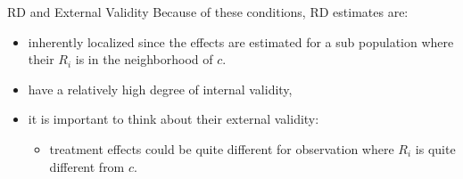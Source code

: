 \documentclass[
  ignorenonframetext,
]{beamer}
\providecommand{\tightlist}{%
  \setlength{\itemsep}{0pt}\setlength{\parskip}{0pt}}
\begin{document}
\begin{frame}{RD and External Validity}
\protect\hypertarget{rd-and-external-validity-3}{}
Because of these conditions, RD estimates are:

\begin{itemize}
\item
  inherently localized since the effects are estimated for a sub
  population where their \(R_i\) is in the neighborhood of \(c\).
\item
  have a relatively high degree of internal validity,
\item
  it is important to think about their external validity:

  \begin{itemize}
  \tightlist
  \item
    treatment effects could be quite different for observation where
    \(R_i\) is quite different from \(c\).
  \end{itemize}
\end{itemize}
\end{frame}
\end{document}
